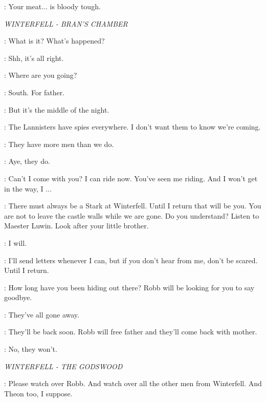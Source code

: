 \UMBER:  Your meat$\ldots$ is bloody tough. 


\scene

\textit{WINTERFELL - BRAN'S CHAMBER} 


\BRAN: What is it? What's happened? 

\ROBB: Shh, it's all right. 

\BRAN: Where are you going? 

\ROBB: South. For father. 

\BRAN: But it's the middle of the night. 

\ROBB: The Lannisters have spies everywhere. I don't want them to know we're coming. 

\BRAN: They have more men than we do. 

\ROBB: Aye, they do. 

\BRAN: Can't I come with you? I can ride now. You've seen me riding. And I won't get in the way, I $\ldots$  

\ROBB: There must always be a Stark at Winterfell. Until I return that will be you. You are not to leave the castle walls while we are gone. Do you understand? Listen to Maester Luwin. Look after your little brother. 

\BRAN: I will. 

\ROBB: I'll send letters whenever I can, but if you don't hear from me, don't be scared. Until I return. 


\BRAN: How long have you been hiding out there? Robb will be looking for you to say goodbye. 

\RICKON: They've all gone away. 

\BRAN: They'll be back soon. Robb will free father and they'll come back with mother. 

\RICKON: No, they won't. 


\scene

\textit{WINTERFELL - THE GODSWOOD} 


\BRAN: Please watch over Robb. And watch over all the other men from Winterfell. And Theon too, I suppose. 


